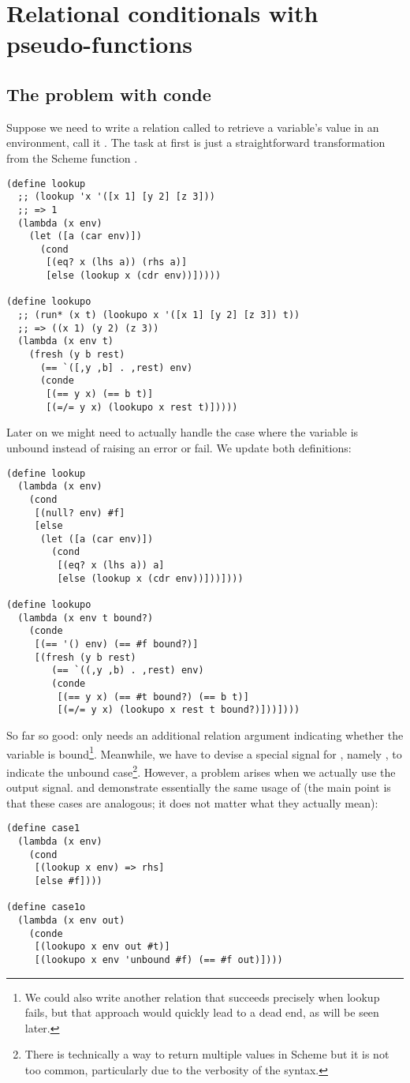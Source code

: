 \section{Relational conditionals with pseudo-functions}\label{reif}
\subsection{The problem with conde}
Suppose we need to write a relation called to retrieve a variable's value in an environment, call it . The task at first is just a straightforward transformation from the Scheme function .
\begin{lstlisting}
(define lookup
  ;; (lookup 'x '([x 1] [y 2] [z 3]))
  ;; => 1
  (lambda (x env)
    (let ([a (car env)])
      (cond
       [(eq? x (lhs a)) (rhs a)]
       [else (lookup x (cdr env))]))))

(define lookupo
  ;; (run* (x t) (lookupo x '([x 1] [y 2] [z 3]) t))
  ;; => ((x 1) (y 2) (z 3))
  (lambda (x env t)
    (fresh (y b rest)
      (== `([,y ,b] . ,rest) env)
      (conde
       [(== y x) (== b t)]
       [(=/= y x) (lookupo x rest t)]))))
\end{lstlisting}

Later on we might need to actually handle the case where the variable is unbound instead of raising an error or fail. We update both definitions:
\begin{lstlisting}
(define lookup
  (lambda (x env)
    (cond
     [(null? env) #f]
     [else
      (let ([a (car env)])
        (cond
         [(eq? x (lhs a)) a]
         [else (lookup x (cdr env))]))])))

(define lookupo
  (lambda (x env t bound?)
    (conde
     [(== '() env) (== #f bound?)]
     [(fresh (y b rest)
        (== `((,y ,b) . ,rest) env)
        (conde
         [(== y x) (== #t bound?) (== b t)]
         [(=/= y x) (lookupo x rest t bound?)]))])))
\end{lstlisting}

So far so good:  only needs an additional relation argument indicating whether the variable is bound\footnote{We could also write another relation that succeeds precisely when lookup fails, but that approach would quickly lead to a dead end, as will be seen later.}. Meanwhile, we have to devise a special signal for , namely , to indicate the unbound case\footnote{There is technically a way to return multiple values in Scheme but it is not too common, particularly due to the verbosity of the syntax.}. However, a problem arises when we actually use the output signal.  and  demonstrate essentially the same usage of  (the main point is that these cases are analogous; it does not matter what they actually mean):
\begin{lstlisting}
(define case1
  (lambda (x env)
    (cond
     [(lookup x env) => rhs]
     [else #f])))

(define case1o
  (lambda (x env out)
    (conde
     [(lookupo x env out #t)]
     [(lookupo x env 'unbound #f) (== #f out)])))
\end{lstlisting}

